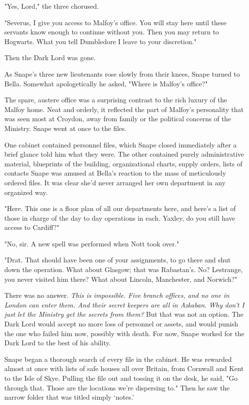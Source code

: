 "Yes, Lord," the three chorused.

"Severus, I give you access to Malfoy's office. You will stay here until these servants know enough to continue without you. Then you may return to Hogwarts. What you tell Dumbledore I leave to your discretion."

Then the Dark Lord was gone.

As Snape's three new lieutenants rose slowly from their knees, Snape turned to Bella. Somewhat apologetically he asked, "Where is Malfoy's office?"

The spare, austere office was a surprising contrast to the rich luxury of the Malfoy home. Neat and orderly, it reflected the part of Malfoy's personality that was seen most at Croydon, away from family or the political concerns of the Ministry. Snape went at once to the files.

One cabinet contained personnel files, which Snape closed immediately after a brief glance told him what they were. The other contained purely administrative material, blueprints of the building, organizational charts, supply orders, lists of contacts{\el} Snape was amused at Bella's reaction to the mass of meticulously ordered files. It was clear she'd never arranged her own department in any organized way.

"Here. This one is a floor plan of all our departments here, and here's a list of those in charge of the day to day operations in each. Yaxley, do you still have access to Cardiff?"

"No, sir. A new spell was performed when Nott took over."

"Drat. That should have been one of your assignments, to go there and shut down the operation. What about Glasgow; that was Rabastan's. No? Lestrange, you never visited him there? What about Lincoln, Manchester, and Norwich?"

There was no answer. \emph{This is impossible. Five branch offices, and no one in London can enter them. And their secret keepers are all in Azkaban. Why don't I just let the Ministry get the secrets from them?} But that was not an option. The Dark Lord would accept no more loss of personnel or assets, and would punish the one who failed him now, possibly with death. For now, Snape worked for the Dark Lord to the best of his ability.

Snape began a thorough search of every file in the cabinet. He was rewarded almost at once with lists of safe houses all over Britain, from Cornwall and Kent to the Isle of Skye. Pulling the file out and tossing it on the desk, he said, "Go through that. Those are the locations we're dispersing to." Then he saw the narrow folder that was titled simply `notes.'

